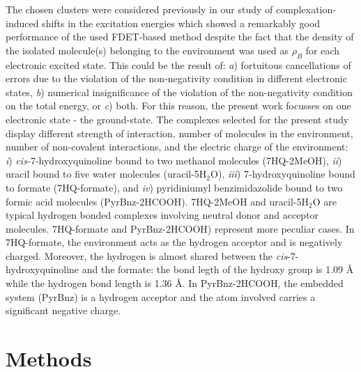 \documentclass[amsmath,amssymb,preprint,aip,jcp]{revtex4-1}
\begin{document}
The chosen clusters were considered previously in our study of complexation-induced shifts in the excitation energies \cite{Ricardi2018} which showed a remarkably good performance of the used FDET-based method despite the fact that the density of the isolated molecule(s) belonging to the environment was used as $\rho_B$ for each electronic excited state. This could be the result of: {\it a}) fortuitous cancellations of errors due to the violation of the non-negativity condition in different electronic states, {\it b}) numerical insignificance of the violation of the non-negativity condition on the total energy, or {\it c}) both. 
For this reason, the present work focusses on one electronic state - the ground-state.
The complexes selected for the present study display different strength of interaction, number of molecules in the environment, number of non-covalent interactions, and the electric charge of the environment:
{\it i}) \textit{cis-}7-hydroxyquinoline bound to two methanol molecules (7HQ-2MeOH), {\it ii}) uracil bound to five water molecules (uracil-5H$_2$O), {\it iii}) 7-hydroxyquinoline bound to formate (7HQ-formate), and {\it iv}) pyridiniumyl benzimidazolide bound to two formic acid molecules (PyrBnz-2HCOOH). 
7HQ-2MeOH and uracil-5H$_2$O are typical hydrogen bonded complexes involving neutral donor and acceptor molecules. 7HQ-formate and PyrBnz-2HCOOH) represent more peculiar cases. In 7HQ-formate, the environment acts as the hydrogen acceptor and is negatively charged. Moreover, the hydrogen is almost shared between the \textit{cis}-7-hydroxyquinoline and the formate: the bond legth of the hydroxy group is 1.09 {\AA} while the hydrogen bond length is 1.36 {\AA}. 
In PyrBnz-2HCOOH, the embedded system (PyrBnz) is a hydrogen acceptor and the atom involved carries a significant negative charge.
\section{Methods}
\end{document}
